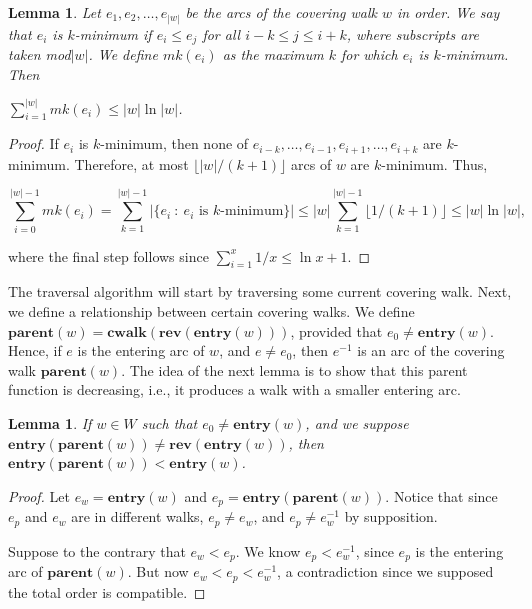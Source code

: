 \documentclass[12pt,letterpaper,oneside]{book}
\newcommand{\rev}{\textbf{rev}}
\newcommand{\cwalk}{\textbf{cwalk}}
\newcommand{\entry}{\textbf{entry}}
\newcommand{\parent}{\textbf{parent}}
\newtheorem{lemma}[theorem]{Lemma}
\begin{document}
\begin{lemma}\label{hme}
\emph{\cite{BM}}  Let $e_1,e_2,\ldots,e_{|w|}$ be the arcs of the covering walk $w$ in order.  We say that $e_i$ is $k$-minimum if $e_i\le e_j$ for all 
$i-k\le j\le i+k$, where subscripts are taken mod$|w|$.  We define $mk(e_i)$ as the maximum $k$ for which $e_i$ is $k$-minimum.  Then 

$\sum_{i=1}^{|w|} mk(e_i) \le |w| \ln |w|$.
\end{lemma}
\begin{proof}
If $e_i$ is $k$-minimum, then none of $e_{i-k},\ldots, e_{i-1},e_{i+1},\ldots, e_{i+k}$ are 
$k$-minimum.  Therefore, at most $\lfloor |w|/(k+1) \rfloor$ arcs of $w$ are $k$-minimum.  Thus, 

\begin{displaymath}
\sum_{i=0}^{|w|-1} mk(e_i) = \sum_{k=1}^{|w|-1} |\{e_i \: : \: e_i \mbox{ is } k\mbox{-minimum} \} | 
\le  |w| \sum_{k=1}^{|w|-1} \lfloor  1/ (k+1) \rfloor 
\le |w| \ln |w|,
\end{displaymath}

where the final step follows since $\sum_{i=1}^x 1/x \le \ln x+1$.  

\end{proof}






The traversal algorithm will start by traversing some current covering walk.  
Next, we define a relationship between certain covering walks.  We define $\parent(w) = \cwalk(\rev(\entry(w)))$, provided that $e_0\ne \entry(w)$.  
Hence, if $e$ is the entering arc of $w$, and $e\ne e_0$, then $e^{-1}$ is an arc of the covering walk $\parent(w)$.  
The idea of the next lemma is to show that this parent function is decreasing, i.e., it produces a walk with a smaller 
entering arc.  

\begin{lemma}  
\label{lemparent}
If $w\in W$ such that $e_0\ne \entry(w)$, and we suppose \newline
$\entry(\parent(w))\ne \rev(\entry(w))$, then $\entry(\parent(w)) < \entry(w)$.  
\end{lemma}
\begin{proof} 
Let $e_w = \entry(w)$ and $e_p = \entry(\parent(w))$.  Notice that since $e_p$ and $e_w$ are in different walks, 
$e_p \ne e_w$, and $e_p\ne e_w^{-1}$ by supposition.  

Suppose to the 
contrary that $e_w <e_p$.  We know $e_p < e_w^{-1}$, since 
$e_p$ is the entering arc of $\parent(w)$.  But now $e_w < e_p < e_w^{-1}$, a contradiction since 
we supposed the total order is compatible.  
\end{proof}
\end{document}
